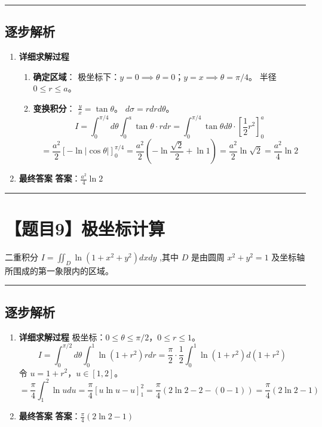 \documentclass[UTF8]{ctexart}
\newenvironment{redenv}{\color{red}}{}
\newenvironment{detailedanalysis}{%
    \color{red}
    \begin{enumerate}[label=\textbf{第\arabic*步：}, leftmargin=*, align=left, itemsep=1.5ex]
}{%
    \end{enumerate}
}
\newcommand{\problemrule}{\noindent\rule{\textwidth}{1.5pt}\vspace{-0.8em}}
\newcommand{\analysisrule}{\noindent\rule{\textwidth}{0.8pt}\vspace{-0.8em}}
\begin{document}
\begin{redenv}
\analysisrule
\subsection*{逐步解析}

\begin{detailedanalysis}
\item \textbf{详细求解过程}
\begin{enumerate}[label=(\arabic*)]
\item \textbf{确定区域}：
极坐标下：$y=0 \implies \theta=0$；$y=x \implies \theta=\pi/4$。
半径 $0 \le r \le a$。
\item \textbf{变换积分}：
$\frac{y}{x} = \tan\theta$。
$d\sigma = r dr d\theta$。
$$ I = \int_0^{\pi/4} d\theta \int_0^a \tan\theta \cdot r dr = \int_0^{\pi/4} \tan\theta d\theta \cdot [\frac{1}{2}r^2]_0^a $$
$$ = \frac{a^2}{2} [-\ln|\cos\theta|]_0^{\pi/4} = \frac{a^2}{2} (-\ln\frac{\sqrt{2}}{2} + \ln 1) = \frac{a^2}{2} \ln\sqrt{2} = \frac{a^2}{4} \ln 2 $$
\end{enumerate}

\item \textbf{最终答案}
\textbf{答案}：$ \frac{a^2}{4} \ln 2 $
\end{detailedanalysis}
\end{redenv}

\problemrule
\section*{【题目9】极坐标计算}
二重积分 $ I=\iint_{D}\ln(1+x^{2}+y^{2})dxdy $ ,其中 $D$ 是由圆周 $ x^{2}+y^{2}=1 $ 及坐标轴所围成的第一象限内的区域。

\begin{redenv}
\analysisrule
\subsection*{逐步解析}

\begin{detailedanalysis}
\item \textbf{详细求解过程}
极坐标：$0 \le \theta \le \pi/2$，$0 \le r \le 1$。
$$ I = \int_0^{\pi/2} d\theta \int_0^1 \ln(1+r^2) r dr = \frac{\pi}{2} \cdot \frac{1}{2} \int_0^1 \ln(1+r^2) d(1+r^2) $$
令 $u = 1+r^2$，$u \in [1, 2]$。
$$ = \frac{\pi}{4} \int_1^2 \ln u du = \frac{\pi}{4} [u\ln u - u]_1^2 = \frac{\pi}{4} (2\ln 2 - 2 - (0 - 1)) = \frac{\pi}{4} (2\ln 2 - 1) $$

\item \textbf{最终答案}
\textbf{答案}：$ \frac{\pi}{4} (2\ln 2 - 1) $
\end{detailedanalysis}
\end{redenv}
\end{document}
